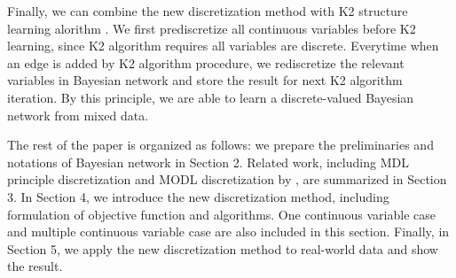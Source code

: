Finally, we can combine the new discretization method with K2 structure learning alorithm \citep{K2}. We first prediscretize all continuous variables before K2 learning, since K2 algorithm requires all variables are discrete. Everytime when an edge is added by K2 algorithm procedure, we rediscretize the relevant variables in Bayesian network and store the result for next K2 algorithm iteration. By this principle, we are able to learn a discrete-valued Bayesian network from mixed data.

The rest of the paper is organized as follows: we prepare the preliminaries and notations of Bayesian network in Section 2. Related work, including MDL principle discretization \citep{Friedman_1996} and MODL discretization by \citet{Boulle_2006}, are summarized in Section 3. In Section 4, we introduce the new discretization method, including formulation of objective function and algorithms. One continuous variable case and multiple continuous variable case are also included in this section. Finally, in Section 5, we apply the new discretization method to real-world data and show the result.
%
%
